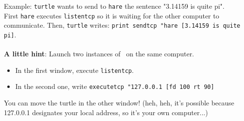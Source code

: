 Example: \texttt{turtle} wants to send to \texttt{hare} the sentence "3.14159 is quite pi".\\
First \texttt{hare} executes \texttt{listentcp} so it is waiting for the other computer to communicate. Then, \texttt{turtle} writes: \texttt{print~sendtcp~"hare~[3.14159 is quite pi]}.\\ \\
\textbf{A little hint}: Launch two instances of \xlogo\ on the same computer.
\begin{itemize}
 \item In the first window, execute \texttt{listentcp}.
 \item In the second one, write \texttt{executetcp "127.0.0.1 [fd 100 rt 90]}
\end{itemize}
You can move the turtle in the other window! (heh, heh, it's possible because 127.0.0.1 designates your local address, so it's your own computer...)




